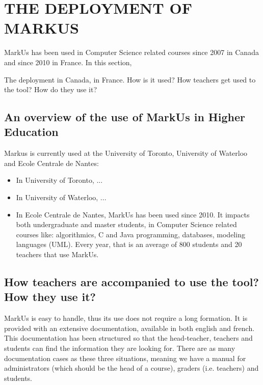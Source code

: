 \documentclass[twocolumn,10pt]{asme2e}
\begin{document}

\section*{THE DEPLOYMENT OF MARKUS}

MarkUs has been used in Computer Science related courses since 2007 in Canada and since 2010 in France. In this section, 

The deployment in Canada, in France. How is it used? How teachers get used to the tool? How do they use it?

\subsection*{An overview of the use of MarkUs in Higher Education}

Markus is currently used at the University of Toronto, University of Waterloo and Ecole Centrale de Nantes: 
\begin{itemize}
\item In University of Toronto, ... %
\item In University of Waterloo, ... %
\item In Ecole Centrale de Nantes, MarkUs has been used since 2010. It impacts both undergraduate and master students, in Computer Science related courses like: algorithmics, C and Java programming, databases, modeling languages (UML). Every year, that is an average of 800 students and 20 teachers that use MarkUs. %
\end{itemize}

\subsection*{How teachers are accompanied to use the tool? How they use it?}

MarkUs is easy to handle, thus its use does not require a long formation. It is provided with an extensive documentation, available in both english and french. This documentation has been structured so that the head-teacher, teachers and students can find the information they are looking for. There are as many documentation cases as these three situations, meaning we have a manual for administrators (which should be the head of a course), graders (i.e. teachers) and students. 
\end{document}
